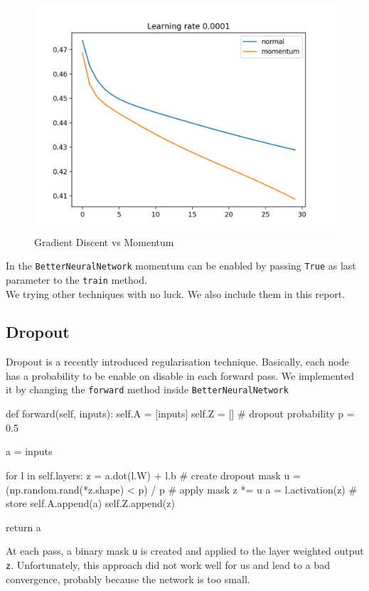 \documentclass[11pt]{article}
\begin{document}
\begin{figure}[H]
\includegraphics[scale=0.35]{images/momentum_plot_0,0001.png}	
\caption{Gradient Discent vs Momentum}
\end{figure}
In the \texttt{BetterNeuralNetwork} momentum can be enabled by passing \texttt{True} as last parameter to the \texttt{train} method.
\\
We trying other techniques with no luck. We also include them in this report.
\subsection{Dropout}
Dropout is a recently introduced regularisation technique. Basically, each node has a probability to be enable on disable in each forward pass. We implemented it by changing the \texttt{forward} method inside \texttt{BetterNeuralNetwork}
\begin{python}
    def forward(self, inputs):
        self.A = [inputs]
        self.Z = []
        # dropout probability
        p = 0.5
        
        a = inputs

        for l in self.layers:
            z = a.dot(l.W) + l.b
            # create dropout mask
            u = (np.random.rand(*z.shape) < p) / p
            # apply mask
            z *= u
            a = l.activation(z)
            # store
            self.A.append(a)
            self.Z.append(z)

        return a
\end{python}
At each pass, a binary mask \texttt{u} is created and applied to the layer weighted output \texttt{z}. Unfortunately, this approach did not work well for us and lead to a bad convergence, probably because the network is too small.
\end{document}
